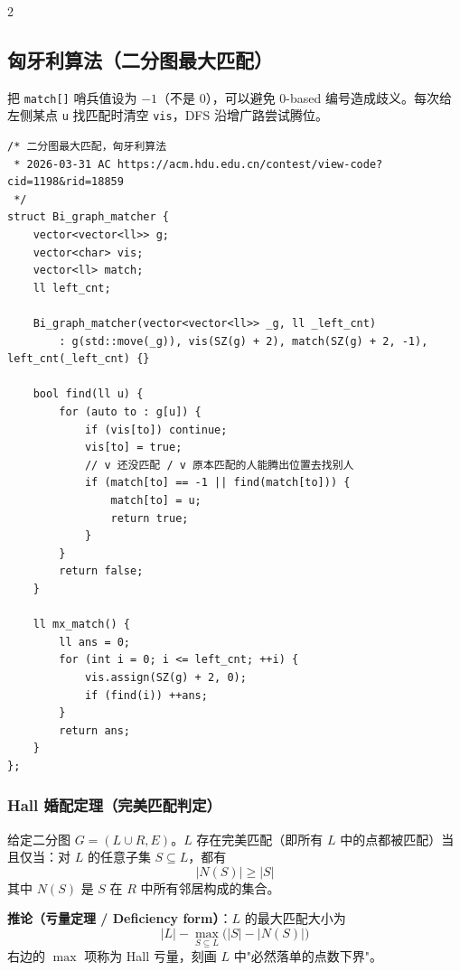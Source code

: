\begin{multicols*}{2}
		\subsection{匈牙利算法（二分图最大匹配）}

		把 \texttt{match[]} 哨兵值设为 $-1$（不是 $0$），可以避免 0-based 编号造成歧义。每次给左侧某点 \texttt{u} 找匹配时清空 \texttt{vis}，DFS 沿增广路尝试腾位。

		\begin{verbatim}
/* 二分图最大匹配，匈牙利算法
 * 2026-03-31 AC https://acm.hdu.edu.cn/contest/view-code?cid=1198&rid=18859
 */
struct Bi_graph_matcher {
    vector<vector<ll>> g;
    vector<char> vis;
    vector<ll> match;
    ll left_cnt;

    Bi_graph_matcher(vector<vector<ll>> _g, ll _left_cnt)
        : g(std::move(_g)), vis(SZ(g) + 2), match(SZ(g) + 2, -1), left_cnt(_left_cnt) {}

    bool find(ll u) {
        for (auto to : g[u]) {
            if (vis[to]) continue;
            vis[to] = true;
            // v 还没匹配 / v 原本匹配的人能腾出位置去找别人
            if (match[to] == -1 || find(match[to])) {
                match[to] = u;
                return true;
            }
        }
        return false;
    }

    ll mx_match() {
        ll ans = 0;
        for (int i = 0; i <= left_cnt; ++i) {
            vis.assign(SZ(g) + 2, 0);
            if (find(i)) ++ans;
        }
        return ans;
    }
};
		\end{verbatim}

		\subsubsection{Hall 婚配定理（完美匹配判定）}

		给定二分图 $G = (L \cup R, E)$。$L$ 存在完美匹配（即所有 $L$ 中的点都被匹配）当且仅当：对 $L$ 的任意子集 $S \subseteq L$，都有
		$$|N(S)| \ge |S|$$
		其中 $N(S)$ 是 $S$ 在 $R$ 中所有邻居构成的集合。

		\textbf{推论（亏量定理 / Deficiency form）}：$L$ 的最大匹配大小为
		$$|L| - \max_{S \subseteq L} \bigl(|S| - |N(S)|\bigr)$$
		右边的 $\max$ 项称为 Hall 亏量，刻画 $L$ 中"必然落单的点数下界"。



\end{multicols*}
